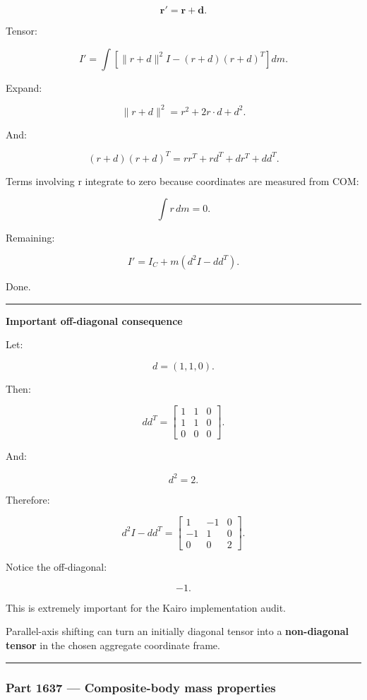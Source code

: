 \[
\mathbf{r}'
=
\mathbf{r}+\mathbf{d}.
\]

Tensor:

\[
I'
=
\int
[
\|r+d\|^2I
-
(r+d)(r+d)^T
]
dm.
\]

Expand:

\[
\|r+d\|^2
=
r^2+2r\cdot d+d^2.
\]

And:

\[
(r+d)(r+d)^T
=
rr^T+rd^T+dr^T+dd^T.
\]

Terms involving r integrate to zero because coordinates are measured from COM:

\[
\int r\,dm=0.
\]

Remaining:

\[
I'
=
I_C+
m(d^2I-dd^T).
\]

Done.

\begin{center}\rule{0.5\linewidth}{0.5pt}\end{center}

\textbf{Important off-diagonal consequence}

Let:

\[
d=(1,1,0).
\]

Then:

\[
dd^T
=
\begin{bmatrix}
1&1&0\\
1&1&0\\
0&0&0
\end{bmatrix}.
\]

And:

\[
d^2=2.
\]

Therefore:

\[
d^2I-dd^T
=
\begin{bmatrix}
1&-1&0\\
-1&1&0\\
0&0&2
\end{bmatrix}.
\]

Notice the off-diagonal:

\[
-1.
\]

This is extremely important for the Kairo implementation audit.

Parallel-axis shifting can turn an initially diagonal tensor into a \textbf{non-diagonal tensor} in the chosen aggregate coordinate frame.

\begin{center}\rule{0.5\linewidth}{0.5pt}\end{center}

\subsubsection{Part 1637 --- Composite-body mass properties}\label{part-1637-composite-body-mass-properties}

